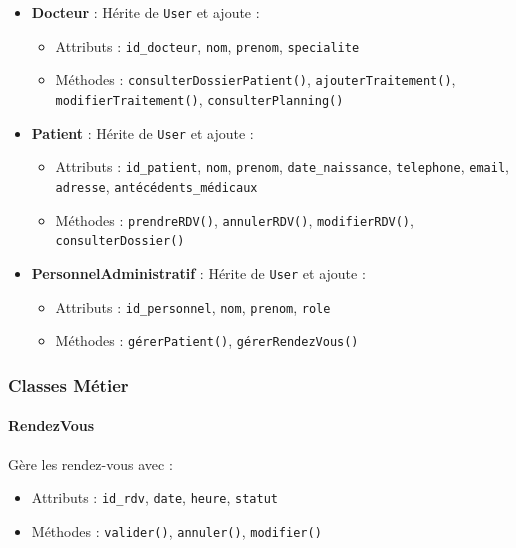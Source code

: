 \documentclass[12pt,a4paper]{report}
\begin{document}
\begin{itemize}
    \item \textbf{Docteur} : Hérite de \texttt{User} et ajoute :
    \begin{itemize}
        \item Attributs : \texttt{id\_docteur}, \texttt{nom}, \texttt{prenom}, \texttt{specialite}
        \item Méthodes : \texttt{consulterDossierPatient()}, \texttt{ajouterTraitement()}, \texttt{modifierTraitement()}, \texttt{consulterPlanning()}
    \end{itemize}
    
    \item \textbf{Patient} : Hérite de \texttt{User} et ajoute :
    \begin{itemize}
        \item Attributs : \texttt{id\_patient}, \texttt{nom}, \texttt{prenom}, \texttt{date\_naissance}, \texttt{telephone}, \texttt{email}, \texttt{adresse}, \texttt{antécédents\_médicaux}
        \item Méthodes : \texttt{prendreRDV()}, \texttt{annulerRDV()}, \texttt{modifierRDV()}, \texttt{consulterDossier()}
    \end{itemize}
    
    \item \textbf{PersonnelAdministratif} : Hérite de \texttt{User} et ajoute :
    \begin{itemize}
        \item Attributs : \texttt{id\_personnel}, \texttt{nom}, \texttt{prenom}, \texttt{role}
        \item Méthodes : \texttt{gérerPatient()}, \texttt{gérerRendezVous()}
    \end{itemize}
\end{itemize}

\subsubsection{Classes Métier}

\paragraph{RendezVous}

Gère les rendez-vous avec :
\begin{itemize}
    \item Attributs : \texttt{id\_rdv}, \texttt{date}, \texttt{heure}, \texttt{statut}
    \item Méthodes : \texttt{valider()}, \texttt{annuler()}, \texttt{modifier()}
\end{itemize}
\end{document}
